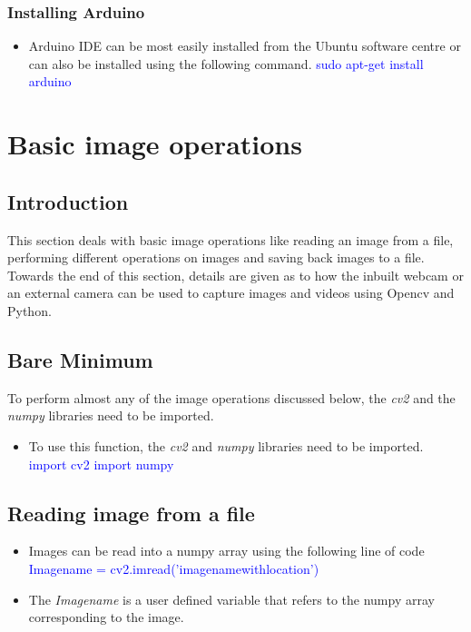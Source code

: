 \documentclass[a4paper,12pt]{article}
\begin{document}
\subsubsection*{Installing Arduino}
\begin{itemize}
 \item Arduino IDE can be most easily installed from the Ubuntu software centre or can also be installed using the following command.
  \newline \textcolor{blue}{sudo apt-get install arduino}
\end{itemize}

\newpage
\section{Basic image operations}
\subsection{Introduction}
This section deals with basic image operations like reading an image from a file, performing different operations on images and 
saving back images to a file. Towards the end of this section, details are given as to how the inbuilt webcam or an external 
camera can be used to capture images and videos using Opencv and Python.

\subsection{Bare Minimum}
To perform almost any of the image operations discussed below, the \emph{cv2} and the \emph{numpy} libraries need to be imported.
\begin{itemize}
 \item To use this function, the \emph{ cv2} and \emph{numpy} libraries need to be imported.
 \newline \textcolor{blue}{import cv2}
 \newline \textcolor{blue}{import numpy}
\end{itemize}

\subsection{Reading image from a file}
\begin{itemize}
 \item Images can be read into a numpy array using the following line of code
 \newline \textcolor{blue}{Image\textunderscore name = cv2.imread('image\textunderscore name\textunderscore with\textunderscore location’)}
 \item The \emph {Image\textunderscore name} is a user defined variable that refers to the numpy array corresponding to the image.
 
\end{itemize}
\end{document}
